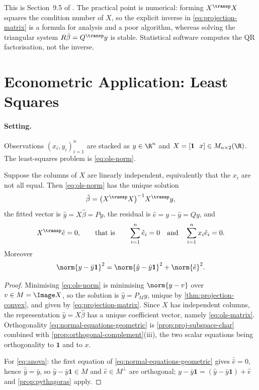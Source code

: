 This is Section~9.5 of \textcite[pp.~320--323]{fukuda2026notes}. The practical
point is numerical: forming $X^{\transp}X$ squares the condition number of $X$,
so the explicit inverse in \eqref{eq:projection-matrix} is a formula for
analysis and a poor algorithm, whereas solving the triangular system
$R\hat\beta=Q^{\transp}y$ is stable. Statistical software computes the QR
factorisation, not the inverse.

\section{Econometric Application: Least Squares}\label{sec:proj-ols}

\paragraph{Setting.} Observations $(x_i,y_i)_{i=1}^n$ are stacked as
$y\in\R^n$ and $X=[\mathbf1\ \ x]\in M_{n\times2}(\R)$. The least-squares
problem is \eqref{eq:ols-norm}.

\begin{proposition}\label{prop:ols-projection}
	Suppose the columns of $X$ are linearly independent, equivalently that the
	$x_i$ are not all equal. Then \eqref{eq:ols-norm} has the unique solution
	\begin{equation}\label{eq:ols-matrix}
		\hat\beta=\bigl(X^{\transp}X\bigr)^{-1}X^{\transp}y,
	\end{equation}
	the fitted vector is $\hat y=X\hat\beta=Py$, the residual is
	$\hat e=y-\hat y=Qy$, and
	\begin{equation}\label{eq:normal-equations-geometric}
		X^{\transp}\hat e=0,
		\qquad\text{that is}\qquad
		\sum_{i=1}^n\hat e_i=0
		\quad\text{and}\quad\sum_{i=1}^nx_i\hat e_i=0 .
	\end{equation}
	Moreover
	\begin{equation}\label{eq:anova}
		\norm{y-\bar y\mathbf1}^2=\norm{\hat y-\bar y\mathbf1}^2+\norm{\hat e}^2 .
	\end{equation}
\end{proposition}

\begin{proof}
	Minimising \eqref{eq:ols-norm} is minimising $\norm{y-v}$ over
	$v\in M=\Image X$, so the solution is $\hat y=P_My$, unique by
	\autoref{thm:projection-convex}, and given by
	\eqref{eq:projection-matrix}. Since $X$ has independent columns, the
	representation $\hat y=X\hat\beta$ has a unique coefficient vector, namely
	\eqref{eq:ols-matrix}. Orthogonality
	\eqref{eq:normal-equations-geometric} is
	\autoref{prop:proj-subspace-char} combined with
	\autoref{prop:orthogonal-complement}(iii), the two scalar equations being
	orthogonality to $\mathbf1$ and to $x$.

	For \eqref{eq:anova}: the first equation of
	\eqref{eq:normal-equations-geometric} gives
	$\bar{\hat e}=0$, hence $\bar{\hat y}=\bar y$, so
	$\hat y-\bar y\mathbf1\in M$ and $\hat e\in M^{\perp}$ are orthogonal;
	$y-\bar y\mathbf1=(\hat y-\bar y\mathbf1)+\hat e$ and
	\autoref{prop:pythagoras} apply.
\end{proof}

